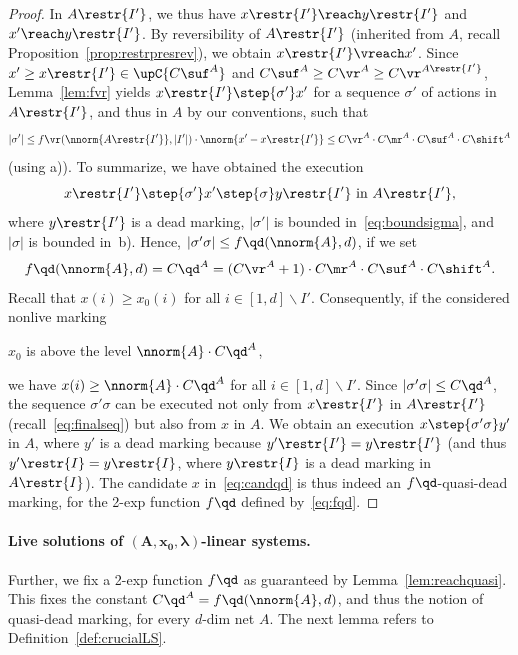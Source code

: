 \begin{proof}
In $A\restr{I'}$, we thus have $x\restr{I'}\reach y\restr{I'}$
and $x'\reach y\restr{I'}$. 
By reversibility of $A\restr{I'}$ (inherited from $A$, recall
Proposition~\ref{prop:restrpresrev}), we obtain 
$x\restr{I'}\vreach x'$. Since $x'\geq x\restr{I'}\in\upC{C\suf^A}$
and $C\suf^A\geq
C\vr^A\geq C\vr^{A\restr{I'}}$,
Lemma~\ref{lem:fvr} yields  
 $x\restr{I'}\step{\sigma'} x'$ for a sequence $\sigma'$ of actions in
 $A\restr{I'}$, and thus in $A$ by our conventions, such that
\begin{equation}\label{eq:boundsigma}
	|\sigma'|\leq f\vr(\nnorm{A\restr{I'}},|I'|)\cdot
\nnorm{x'-x\restr{I'}}\leq C\vr^A\cdot
C\mr^A\cdot C\suf^A\cdot C\shift^A
\end{equation}
(using a)). To summarize, we have obtained the execution 
\begin{equation}\label{eq:finalseq}
	x\restr{I'}\step{\sigma'}x'\step{\sigma}y\restr{I'}\text{ in }A\restr{I'},
\end{equation}
where $y\restr{I'}$ is a dead marking, $|\sigma'|$ is bounded
in~\eqref{eq:boundsigma}, and  $|\sigma|$ is bounded
in~b).
Hence,
 $|\sigma'\sigma|\leq
f\qd(\nnorm{A},d)$, if we set
\begin{equation}\label{eq:fqd}
	f\qd(\nnorm{A},d)=C\qd^A=(C\vr^A+1)\cdot C\mr^A\cdot
C\suf^A\cdot C\shift^A.
\end{equation}
	Recall that $x(i)\geq x_0(i)$ for all $i\in[1,d]\smallsetminus
	I'$. 
	Consequently, if the considered nonlive marking 
\begin{center}	$x_0$ is above the level
	$\nnorm{A}\cdot C\qd^A$,
\end{center}
	we have 
$x(i)\geq\nnorm{A}\cdot C\qd^A$ for all $i\in[1,d]\smallsetminus I'$. 
Since $|\sigma'\sigma|\leq C\qd^A$, the sequence $\sigma'\sigma$ can be
executed not only from $x\restr{I'}$ in $A\restr{I'}$
(recall~\eqref{eq:finalseq}) but
	also from $x$ in $A$. We obtain an execution
	$x\step{\sigma'\sigma}y'$ in $A$, where $y'$ is a dead marking
	because ${y'}\restr{I'}=y\restr{I'}$ (and thus
	${y'}\restr{I}=y\restr{I}$, where $y\restr{I}$ is a dead
	marking in $A\restr{I}$).
The candidate $x$ in~\eqref{eq:candqd} is thus indeed an $f\qd$-quasi-dead marking, for the
2-exp function $f\qd$ defined by~\eqref{eq:fqd}.
\end{proof}	

\paragraph{Live solutions of $\bm{(A,x_0,\lambda)}$-linear systems.}
Further, we fix a 2-exp function $f\qd$ as guaranteed by
Lemma~\ref{lem:reachquasi}.  This fixes the constant
$C\qd^A=f\qd(\nnorm{A},d)$, and thus the notion of quasi-dead marking,
for every $d$-dim net $A$.
The next lemma refers to Definition~\ref{def:crucialLS}.

